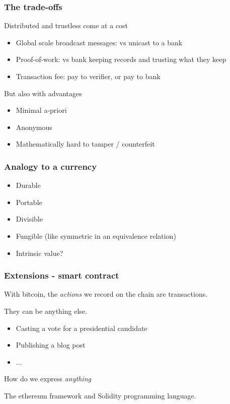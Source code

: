 \documentclass{beamer}
\begin{document}
\begin{frame}
\frametitle{The trade-offs}

Distributed and trustless come at a cost

\begin{itemize}
  \item Global scale broadcast messages: vs unicast to a bank
  \item Proof-of-work: vs bank keeping records and trusting what they keep
  \item Transaction fee: pay to verifier, or pay to bank
\end{itemize}

\vspace{0.2in}
But also with advantages

\begin{itemize}
  \item Minimal a-priori
  \item Anonymous
  \item Mathematically hard to tamper / counterfeit
\end{itemize}

\end{frame}

\begin{frame}
\frametitle{Analogy to a currency}

\begin{itemize}
  \item Durable
  \item Portable
  \item Divisible
  \item Fungible (like symmetric in an equivalence relation)
  \item Intrinsic value?
\end{itemize}

\end{frame}

\begin{frame}
\frametitle{Extensions - smart contract}

With bitcoin, the \textit{actions} we record on the chain are transactions.

They can be anything else.

\vspace{0.2in}

\begin{itemize}
  \item Casting a vote for a presidential candidate
  \item Publishing a blog post
  \item ...
\end{itemize}

\vspace{0.2in}
How do we express \textit{anything}

The ethereum framework and Solidity programming language.

\end{frame}
\end{document}
